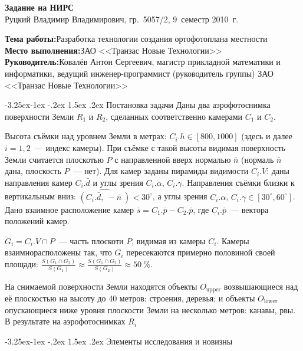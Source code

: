 \documentclass[a4paper,10pt]{article}
\makeatletter
\renewcommand\paragraph{\@startsection{paragraph}{4}{\z@}%
  {-3.25ex\@plus -1ex \@minus -.2ex}%
  {1.5ex \@plus .2ex}%
  {\normalfont\normalsize\bfseries}}
\makeatother
\begin{document}
\begin{center}
\begin{spacing}{1.5}
  {\Large\bfseries Задание на НИРС} \\
  {\large Руцкий Владимир Владимирович, гр.~5057/2, 9~семестр 2010~г.}
\end{spacing}
\end{center}

\noindent\textbf{Тема работы:}\quad Разработка технологии создания ортофотоплана местности \\
\textbf{Место выполнения:}\quad ЗАО <<Транзас Новые Технологии>> \\
\textbf{Руководитель:}\quad Ковалёв Антон Сергеевич, 
магистр прикладной математики и информатики, 
ведущий инженер-программист (руководитель группы) ЗАО <<Транзас Новые Технологии>>

\paragraph{Постановка задачи}
Даны два аэрофотоснимка поверхности Земли $R_1$ и $R_2$, 
сделанных соответственно камерами $C_1$ и $C_2$.

Высота съёмки над уровнем Земли в метрах: $C_i.h \in [800, 1000]$ (здесь и далее $i=1,2$~--- индекс камеры).
При съёмке с такой высоты видимая поверхность Земли считается плоскотью $P$ с направленной вверх нормалью $\bar{n}$
(нормаль $\bar{n}$ дана, плоскость $P$~--- нет).
Для камер заданы пирамиды видимости $C_i.V$: 
даны направления камер $C_i.\bar{d}$ и углы зрения $C_i.\alpha$, $C_i.\gamma$.
Направления съёмки близки к вертикальным вниз: $\widehat{(C_i.\bar{d}, \ -\bar{n}\ )} < 30^{\circ}$,
а углы зрения $C_i.\alpha$, $C_i.\gamma \in [30^{\circ}, 60^{\circ}]$.
Дано взаимное расположение камер $\bar{s}=C_1.\bar{p} - C_2.\bar{p}$, 
где $C_i.\bar{p}$~--- вектора положений камер.

$G_i = C_i.V \cap P$~--- часть плоскоти $P$, видимая из камеры $C_i$.
Камеры взаимнорасположены так, что $G_i$ пересекаются примерно половиной своей площади:
$\frac{S(G_1 \cap G_2)}{S(G_1)} \approx \frac{S(G_1 \cap G_2)}{S(G_2)} \approx 50~\%$.

На снимаемой поверхности Земли находятся объекты $O_{\mathrm{upper}}$ возвышающиеся над её плоскостью на высоту до 40 метров: 
строения, деревья; 
и объекты $O_{\mathrm{lower}}$ опускающиеся ниже уровня плоскости Земли на несколько метров: канавы, рвы.
В результате на аэрофотоснимках $R_i$ 

\paragraph{Элементы исследования и новизны}
\end{document}
